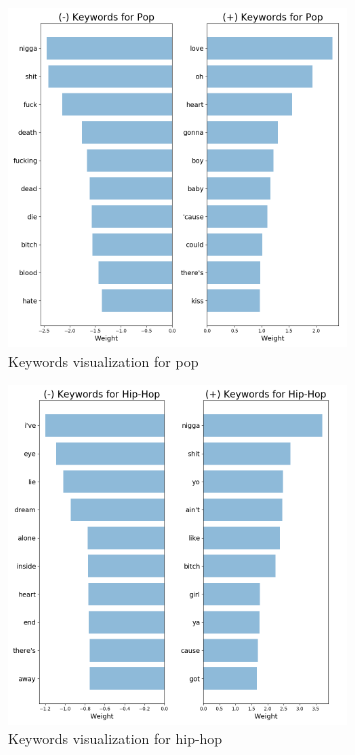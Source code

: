 \documentclass[a4paper,11pt]{article}
\begin{document}
\begin{figure}[h]
\begin{center}
\includegraphics[width=0.8\textwidth]{./img/pop-keywords.png}
\end{center}
\caption{Keywords visualization for pop}
\label{label-kw-pop}
\end{figure}

\begin{figure}[h]
\begin{center}
\includegraphics[width=0.8\textwidth]{./img/hip-hop-keywords.png}
\end{center}
\caption{Keywords visualization for hip-hop}
\label{label-kw-hip-hop}
\end{figure}
\end{document}
